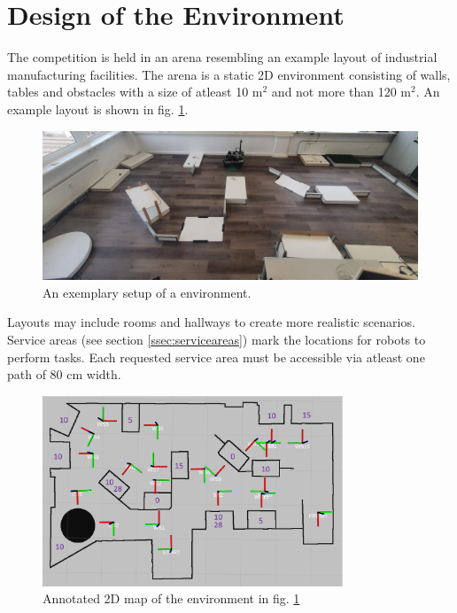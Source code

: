 \section{Design of the Environment}
\label{sec:ArenaDesign}

The competition is held in an arena resembling an example layout of industrial manufacturing facilities. 
The arena is a static 2D environment consisting of walls, tables and obstacles with a size of atleast 10 m$^2$ and not more than 120 m$^2$. 
An example layout is shown in fig. \ref{fig:arena_example}.

\begin{figure} [h!]
\includegraphics[width= \textwidth ]{./images/general_rules/arena_example.jpg}
\caption{An exemplary setup of a \RCAW environment.}
\label{fig:arena_example}
\end{figure}

Layouts may include rooms and hallways to create more realistic scenarios.
Service areas (see section \ref{ssec:serviceareas}) mark the locations for robots to perform tasks.
Each requested service area must be accessible via atleast one path of 80 cm width.

\begin{figure} [h!]
\centering
\includegraphics[width= 0.8\textwidth ]{./images/general_rules/arena_map_annotated}
\caption{Annotated 2D map of the environment in fig. \ref{fig:arena_example}}
\label{fig:arena_map_annotated}
\end{figure}

